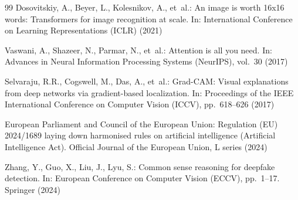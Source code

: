 \documentclass[pdflatex,sn-mathphys-num]{sn-jnl}
\begin{document}
\begin{thebibliography}{99}
Dosovitskiy, A., Beyer, L., Kolesnikov, A., et~al.:
An image is worth 16x16 words: Transformers for image recognition at scale.
In: International Conference on Learning Representations (ICLR) (2021)

Vaswani, A., Shazeer, N., Parmar, N., et~al.:
Attention is all you need.
In: Advances in Neural Information Processing Systems (NeurIPS), vol.~30 (2017)

Selvaraju, R.R., Cogswell, M., Das, A., et~al.:
Grad-CAM: Visual explanations from deep networks via gradient-based localization.
In: Proceedings of the IEEE International Conference on Computer Vision (ICCV), pp.~618--626 (2017)

European Parliament and Council of the European Union:
Regulation (EU) 2024/1689 laying down harmonised rules on artificial intelligence (Artificial Intelligence Act).
Official Journal of the European Union, L series (2024)

Zhang, Y., Guo, X., Liu, J., Lyu, S.:
Common sense reasoning for deepfake detection.
In: European Conference on Computer Vision (ECCV), pp.~1--17. Springer (2024)

\end{thebibliography}
\end{document}
